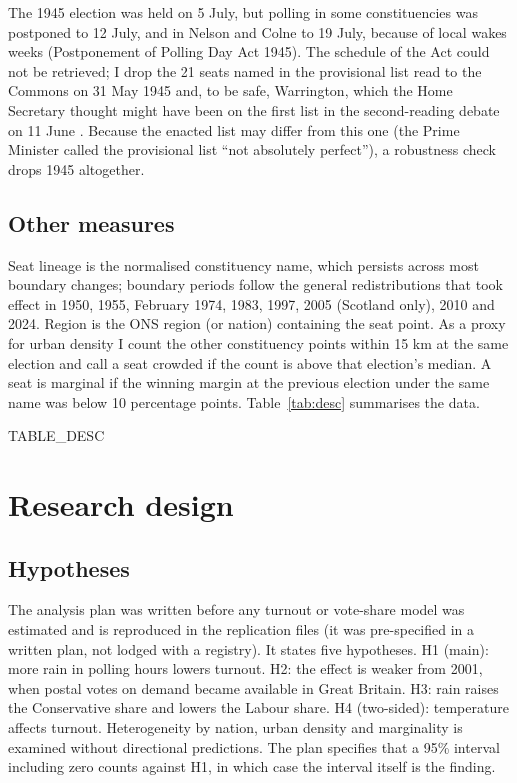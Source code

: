 \documentclass[11pt,a4paper]{article}
\begin{document}
The 1945 election was held on 5 July, but polling in some constituencies was postponed to 12 July, and in Nelson and Colne to 19 July, because of local wakes weeks (Postponement of Polling Day Act 1945). The schedule of the Act could not be retrieved; I drop the 21 seats named in the provisional list read to the Commons on 31 May 1945 and, to be safe, Warrington, which the Home Secretary thought might have been on the first list in the second-reading debate on 11 June \citep{hansard1945a,hansard1945b}. Because the enacted list may differ from this one (the Prime Minister called the provisional list ``not absolutely perfect''), a robustness check drops 1945 altogether.

\subsection{Other measures}
Seat lineage is the normalised constituency name, which persists across most boundary changes; boundary periods follow the general redistributions that took effect in 1950, 1955, February 1974, 1983, 1997, 2005 (Scotland only), 2010 and 2024. Region is the ONS region (or nation) containing the seat point. As a proxy for urban density I count the other constituency points within 15 km at the same election and call a seat crowded if the count is above that election's median. A seat is marginal if the winning margin at the previous election under the same name was below 10 percentage points. Table~\ref{tab:desc} summarises the data.

{{TABLE_DESC}}

\section{Research design}\label{sec:design}
\subsection{Hypotheses}
The analysis plan was written before any turnout or vote-share model was estimated and is reproduced in the replication files (it was pre-specified in a written plan, not lodged with a registry). It states five hypotheses. H1 (main): more rain in polling hours lowers turnout. H2: the effect is weaker from 2001, when postal votes on demand became available in Great Britain. H3: rain raises the Conservative share and lowers the Labour share. H4 (two-sided): temperature affects turnout. Heterogeneity by nation, urban density and marginality is examined without directional predictions. The plan specifies that a 95\% interval including zero counts against H1, in which case the interval itself is the finding.
\end{document}
